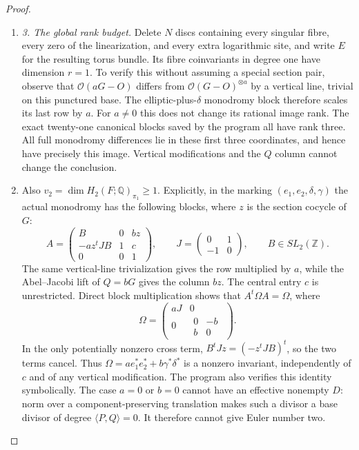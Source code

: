 \begin{proof}
\begin{enumerate}[label=\arabic*.,leftmargin=*]
\item \emph{3. The global rank budget.}
Delete $N$ discs containing every singular fibre, every zero of the
linearization, and every extra logarithmic site, and write $E$ for
the resulting torus bundle. Its fibre coinvariants in degree one
have dimension $r=1$. To verify this without assuming a special
section pair, observe that $\mathcal O(aG-O)$ differs from
$\mathcal O(G-O)^{\otimes a}$ by a vertical line, trivial on this
punctured base. The elliptic-plus-$\delta$ monodromy block therefore
scales its last row by $a$. For $a\ne0$ this does not change its
rational image rank. The exact twenty-one canonical blocks saved
by the program all have rank three. All full monodromy differences
lie in these first three coordinates, and hence have precisely
this image. Vertical modifications and the $Q$ column cannot
change the conclusion.

\item Also $v_2=\dim H_2(F;\mathbb Q)_{\pi_1}\ge1$. Explicitly,
in the marking $(e_1,e_2,\delta,\gamma)$ the actual monodromy
has the following blocks, where $z$ is the section cocycle of $G$:
\[
 A=\begin{pmatrix}
 B&0&bz\\ -az^tJB&1&c\\0&0&1
 \end{pmatrix},\qquad
 J=\begin{pmatrix}0&1\\-1&0\end{pmatrix},\qquad B\in SL_2(\mathbb Z).
\]
The same vertical-line trivialization gives the row multiplied by
$a$, while the Abel--Jacobi lift of $Q=bG$ gives the column $bz$.
The central entry $c$ is unrestricted. Direct block multiplication
shows that $A^t\Omega A=\Omega$, where
\[
 \Omega=\begin{pmatrix}aJ&0\\
 0&\begin{matrix}0&-b\\ b&0\end{matrix}\end{pmatrix}.
\]
In the only potentially nonzero cross term,
$B^tJz=(-z^tJB)^t$, so the two terms cancel. Thus
$\Omega=a e_1^*e_2^*+b\gamma^*\delta^*$ is a nonzero invariant,
independently of $c$ and of any vertical modification. The program
also verifies this identity symbolically. The case $a=0$ or $b=0$ cannot have an effective
nonempty $D$: norm over a component-preserving translation makes
such a divisor a base divisor of degree $\langle P,Q\rangle=0$.
It therefore cannot give Euler number two.


\end{enumerate}
\end{proof}
